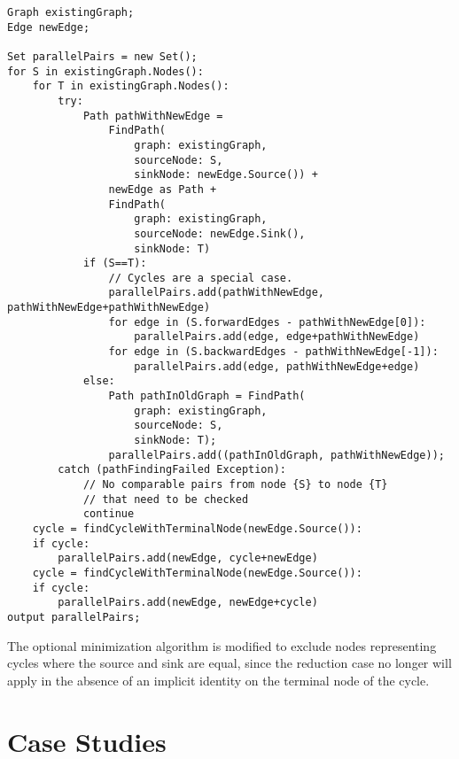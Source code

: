 \documentclass[sigplan,review,anonymous]{acmart}
\begin{document}
\begin{verbatim}
Graph existingGraph;
Edge newEdge;

Set parallelPairs = new Set();
for S in existingGraph.Nodes():
    for T in existingGraph.Nodes():
        try:
            Path pathWithNewEdge = 
                FindPath(
                    graph: existingGraph, 
                    sourceNode: S,
                    sinkNode: newEdge.Source()) +
                newEdge as Path +
                FindPath(
                    graph: existingGraph, 
                    sourceNode: newEdge.Sink(), 
                    sinkNode: T)
            if (S==T):
                // Cycles are a special case.
                parallelPairs.add(pathWithNewEdge, pathWithNewEdge+pathWithNewEdge)
                for edge in (S.forwardEdges - pathWithNewEdge[0]):
                    parallelPairs.add(edge, edge+pathWithNewEdge)
                for edge in (S.backwardEdges - pathWithNewEdge[-1]):
                    parallelPairs.add(edge, pathWithNewEdge+edge)
            else:
                Path pathInOldGraph = FindPath(
                    graph: existingGraph, 
                    sourceNode: S, 
                    sinkNode: T);
                parallelPairs.add((pathInOldGraph, pathWithNewEdge));
        catch (pathFindingFailed Exception):
            // No comparable pairs from node {S} to node {T} 
            // that need to be checked
            continue
    cycle = findCycleWithTerminalNode(newEdge.Source()):
    if cycle:    
        parallelPairs.add(newEdge, cycle+newEdge)
    cycle = findCycleWithTerminalNode(newEdge.Source()):
    if cycle:    
        parallelPairs.add(newEdge, newEdge+cycle)
output parallelPairs;
\end{verbatim}

The optional minimization algorithm is modified to exclude nodes representing cycles where the source and sink are equal, since the reduction case no longer will apply in the absence of an implicit identity on the terminal node of the cycle.

\section{Case Studies}



\end{document}
